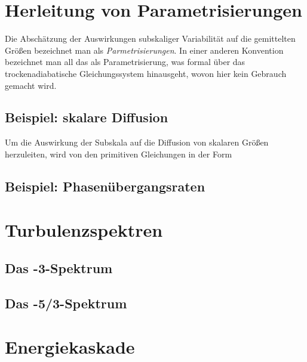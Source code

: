 \documentclass{book}
\begin{document}
\section{Herleitung von Parametrisierungen}
\label{sec:herleitung_von_parametrisierungen}

Die Abschätzung der Auswirkungen subskaliger Variabilität auf die gemittelten Größen bezeichnet man als \textit{Parmetrisierungen}. In einer anderen Konvention bezeichnet man all das als Parametrisierung, was formal über das trockenadiabatische Gleichungssystem hinausgeht, wovon hier kein Gebrauch gemacht wird.

\subsection{Beispiel: skalare Diffusion}
\label{sec:beispiel:skalare_diffusion}

Um die Auswirkung der Subskala auf die Diffusion von skalaren Größen herzuleiten, wird von den primitiven Gleichungen in der Form

\subsection{Beispiel: Phasenübergangsraten}
\label{sec:beispiel:phasenuebergangsraten}

\section{Turbulenzspektren}
\label{sec:turbulenzspektren}

\subsection{Das -3-Spektrum}
\label{sec:das_-3-spektrum}

\subsection{Das -5/3-Spektrum}
\label{sec:das_-5/3-spektrum}

\section{Energiekaskade}
\label{sec:energiekaskade}
\end{document}
